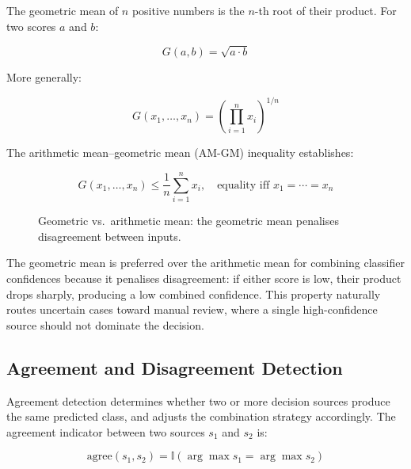 \documentclass[10pt,a4paper]{article}
\begin{document}
The geometric mean of $n$ positive numbers is the $n$-th root of their product. For two scores $a$ and $b$:

\begin{equation}
G(a, b) = \sqrt{a \cdot b}
\label{eq:geometric-mean-simple}
\end{equation}

More generally:

\begin{equation}
G(x_1, \ldots, x_n) = \left(\prod_{i=1}^{n} x_i\right)^{1/n}
\label{eq:geometric-mean-general}
\end{equation}

The arithmetic mean--geometric mean (AM-GM) inequality establishes:

\begin{equation}
G(x_1, \ldots, x_n) \leq \frac{1}{n}\sum_{i=1}^{n} x_i, \quad \text{equality iff } x_1 = \cdots = x_n
\label{eq:am-gm}
\end{equation}

\begin{figure}[H]
    \centering
    \caption{Geometric vs.\ arithmetic mean: the geometric mean penalises disagreement between inputs.}
    \label{fig:geometric-vs-arithmetic-mean}
\end{figure}

The geometric mean is preferred over the arithmetic mean for combining classifier confidences because it penalises disagreement: if either score is low, their product drops sharply, producing a low combined confidence. This property naturally routes uncertain cases toward manual review, where a single high-confidence source should not dominate the decision.

\subsection{Agreement and Disagreement Detection}
\label{sec:agreement-detection}

Agreement detection determines whether two or more decision sources produce the same predicted class, and adjusts the combination strategy accordingly. The agreement indicator between two sources $s_1$ and $s_2$ is:

\begin{equation}
\text{agree}(s_1, s_2) = \mathbb{I}\left(\arg\max s_1 = \arg\max s_2\right)
\label{eq:agreement}
\end{equation}
\end{document}
